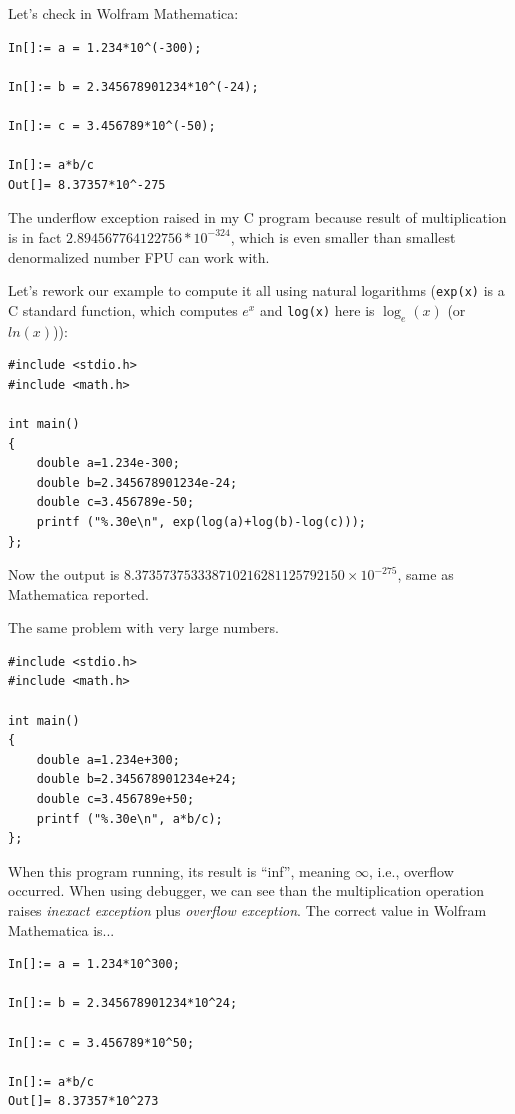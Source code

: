 Let's check in Wolfram Mathematica:

\begin{lstlisting}[caption=Wolfram Mathematica]
In[]:= a = 1.234*10^(-300);

In[]:= b = 2.345678901234*10^(-24);

In[]:= c = 3.456789*10^(-50);

In[]:= a*b/c
Out[]= 8.37357*10^-275
\end{lstlisting}

The underflow exception raised in my C program because result of multiplication is in fact 
$2.894567764122756*10^{-324}$, which is even smaller than smallest denormalized number FPU can work with.

Let's rework our example to compute it all using natural logarithms 
(\texttt{exp(x)} is a C standard function, which computes $e^x$ and \texttt{log(x)} here is $\log_e(x)$ (or $ln(x)$)):

\begin{lstlisting}[caption=C code]
#include <stdio.h>
#include <math.h>

int main()
{
	double a=1.234e-300;
	double b=2.345678901234e-24;
	double c=3.456789e-50;
	printf ("%.30e\n", exp(log(a)+log(b)-log(c)));
};
\end{lstlisting}

Now the output is $8.373573753338710216281125792150 \times 10^{-275}$, same as Mathematica reported.

The same problem with very large numbers.

\begin{lstlisting}[caption=C code]
#include <stdio.h>
#include <math.h>

int main()
{
	double a=1.234e+300;
	double b=2.345678901234e+24;
	double c=3.456789e+50;
	printf ("%.30e\n", a*b/c);
};
\end{lstlisting}

When this program running, its result is ``inf'', meaning $\infty$, i.e., overflow occurred.
When using debugger, we can see than the multiplication operation raises \textit{inexact exception} plus \textit{overflow exception}.
The correct value in Wolfram Mathematica is...

\begin{lstlisting}[caption=Wolfram Mathematica]
In[]:= a = 1.234*10^300;

In[]:= b = 2.345678901234*10^24;

In[]:= c = 3.456789*10^50;

In[]:= a*b/c
Out[]= 8.37357*10^273
\end{lstlisting}

